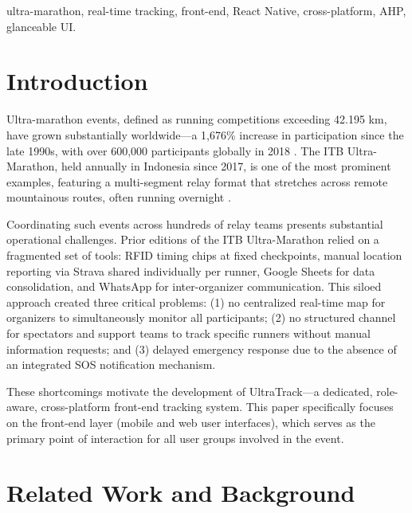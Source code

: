 \documentclass[conference]{IEEEtran}
\begin{document}
\begin{IEEEkeywords}
ultra-marathon, real-time tracking, front-end, React Native, cross-platform, AHP, glanceable UI.
\end{IEEEkeywords}

\section{Introduction}

Ultra-marathon events, defined as running competitions exceeding 42.195 km, have grown substantially worldwide---a 1,676\% increase in participation since the late 1990s, with over 600,000 participants globally in 2018 \cite{WMS2024}. The ITB Ultra-Marathon, held annually in Indonesia since 2017, is one of the most prominent examples, featuring a multi-segment relay format that stretches across remote mountainous routes, often running overnight \cite{Hafizh2025}.

Coordinating such events across hundreds of relay teams presents substantial operational challenges. Prior editions of the ITB Ultra-Marathon relied on a fragmented set of tools: RFID timing chips at fixed checkpoints, manual location reporting via Strava shared individually per runner, Google Sheets for data consolidation, and WhatsApp for inter-organizer communication. This siloed approach created three critical problems: (1) no centralized real-time map for organizers to simultaneously monitor all participants; (2) no structured channel for spectators and support teams to track specific runners without manual information requests; and (3) delayed emergency response due to the absence of an integrated SOS notification mechanism.

These shortcomings motivate the development of UltraTrack---a dedicated, role-aware, cross-platform front-end tracking system. This paper specifically focuses on the front-end layer (mobile and web user interfaces), which serves as the primary point of interaction for all user groups involved in the event.

\section{Related Work and Background}
\end{document}
